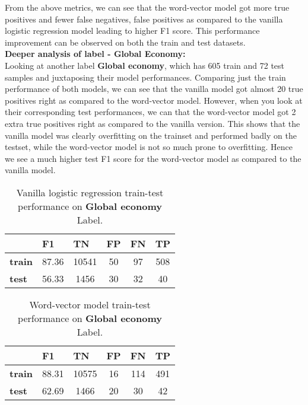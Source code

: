 From the above metrics, we can see that the word-vector model got more true positives and fewer false negatives, false positives as compared to the vanilla logistic regression model leading to higher F1 score. This performance improvement can be observed on both the train and test datasets.\\

\noindent \textbf{Deeper analysis of label - Global Economy:}\\

Looking at another label \textbf{Global economy}, which has 605 train and 72 test samples and juxtaposing their model performances. Comparing just the train performance of both models, we can see that the vanilla model got almost 20 true positives right as compared to the word-vector model. However, when you look at their corresponding test performances, we can that the word-vector model got 2 extra true positives right as compared to the vanilla version. This shows that the vanilla model was clearly overfitting on the trainset and performed badly on the testset, while the word-vector model is not so much prone to overfitting. Hence we see a much higher test F1 score for the word-vector model as compared to the vanilla model.

\begin{table}[htbp]
\centering
\begin{tabular}{l|c|c|c|c|c|}
 & \multicolumn{1}{l|}{\textbf{F1}} & \multicolumn{1}{l|}{\textbf{TN}} & \multicolumn{1}{l|}{\textbf{FP}} & \multicolumn{1}{l|}{\textbf{FN}} & \multicolumn{1}{l|}{\textbf{TP}} \\ \hline
\textbf{train} & 87.36 & 10541 & 50 & 97 & 508 \\
\textbf{test} & 56.33 & 1456 & 30 & 32 & 40
\end{tabular}
\caption{\label{tab:widgets}Vanilla logistic regression train-test performance on \textbf{Global economy} Label.}
\end{table}

\begin{table}[htbp]
\centering
\begin{tabular}{l|c|c|c|c|c|}
 & \multicolumn{1}{l|}{\textbf{F1}} & \multicolumn{1}{l|}{\textbf{TN}} & \multicolumn{1}{l|}{\textbf{FP}} & \multicolumn{1}{l|}{\textbf{FN}} & \multicolumn{1}{l|}{\textbf{TP}} \\ \hline
\textbf{train} & 88.31 & 10575 & 16 & 114 & 491 \\
\textbf{test} & 62.69 & 1466 & 20 & 30 & 42
\end{tabular}
\caption{\label{tab:widgets}Word-vector model train-test performance on \textbf{Global economy} Label.}
\end{table}

